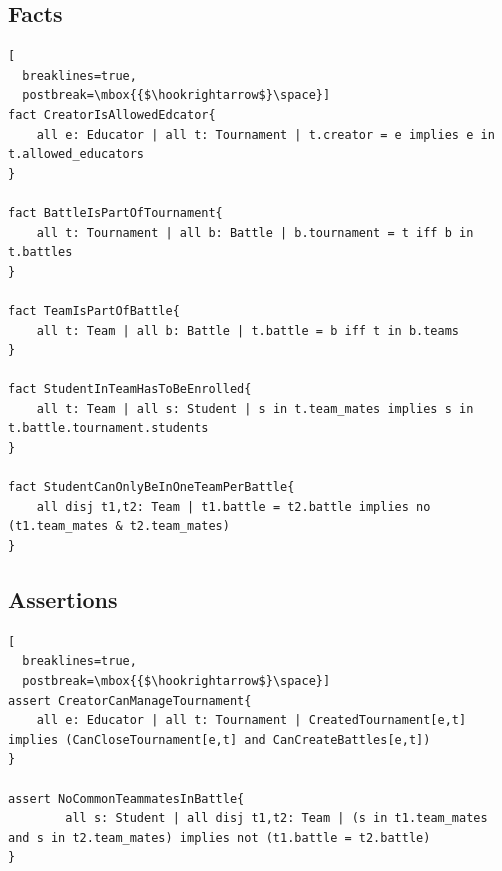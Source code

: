 \documentclass{article}
\begin{document}
\subsection{Facts}
\begin{lstlisting}[
  breaklines=true,
  postbreak=\mbox{{$\hookrightarrow$}\space}]
fact CreatorIsAllowedEdcator{
    all e: Educator | all t: Tournament | t.creator = e implies e in t.allowed_educators
}

fact BattleIsPartOfTournament{
    all t: Tournament | all b: Battle | b.tournament = t iff b in t.battles
}

fact TeamIsPartOfBattle{
    all t: Team | all b: Battle | t.battle = b iff t in b.teams
}

fact StudentInTeamHasToBeEnrolled{
    all t: Team | all s: Student | s in t.team_mates implies s in t.battle.tournament.students
}

fact StudentCanOnlyBeInOneTeamPerBattle{
	all disj t1,t2: Team | t1.battle = t2.battle implies no (t1.team_mates & t2.team_mates)
}
\end{lstlisting}

\subsection{Assertions}
\begin{lstlisting}[
  breaklines=true,
  postbreak=\mbox{{$\hookrightarrow$}\space}]
assert CreatorCanManageTournament{
    all e: Educator | all t: Tournament | CreatedTournament[e,t] implies (CanCloseTournament[e,t] and CanCreateBattles[e,t])
}

assert NoCommonTeammatesInBattle{
        all s: Student | all disj t1,t2: Team | (s in t1.team_mates and s in t2.team_mates) implies not (t1.battle = t2.battle)
}
\end{lstlisting}
\end{document}
